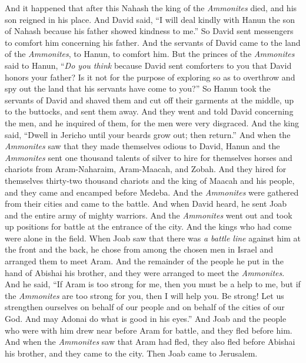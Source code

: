 \begin{biblechapter} %
 And it happened that after this Nahash the king of the \textit{Ammonites} died, and his son reigned in his place.
\verse And David said, “I will deal kindly with Hanun the son of Nahash because his father showed kindness to me.” So David sent messengers to comfort him concerning his father. And the servants of David came to the land of the \textit{Ammonites}, to Hanun, to comfort him.
\verse But the princes of the \textit{Ammonites} said to Hanun, “\textit{Do you think} because David sent comforters to you that David honors your father? Is it not for the purpose of exploring so as to overthrow and spy out the land that his servants have come to you?”
\verse So Hanun took the servants of David and shaved them and cut off their garments at the middle, up to the buttocks, and sent them away.
\verse And they went and told David concerning the men, and he inquired of them, for the men were very disgraced. And the king said, “Dwell in Jericho until your beards grow out; then return.”
\verse And when the \textit{Ammonites} saw that they made themselves odious to David, Hanun and the \textit{Ammonites} sent one thousand talents of silver to hire for themselves horses and chariots from Aram-Naharaim, Aram-Maacah, and Zobah.
\verse And they hired for themselves thirty-two thousand chariots and the king of Maacah and his people, and they came and encamped before Medeba. And the \textit{Ammonites} were gathered from their cities and came to the battle.
\verse And when David heard, he sent Joab and the entire army of mighty warriors.
\verse And the \textit{Ammonites} went out and took up positions for battle at the entrance of the city. And the kings who had come were alone in the field.
\verse When Joab saw that there was \textit{a battle line} against him at the front and the back, he chose from among the chosen men in Israel and arranged them to meet Aram.
\verse And the remainder of the people he put in the hand of Abishai his brother, and they were arranged to meet the \textit{Ammonites}.
\verse And he said, “If Aram is too strong for me, then you must be a help to me, but if the \textit{Ammonites} are too strong for you, then I will help you.
\verse Be strong! Let us strengthen ourselves on behalf of our people and on behalf of the cities of our God. And may Adonai do what is good in his eyes.”
\verse And Joab and the people who were with him drew near before Aram for battle, and they fled before him.
\verse And when the \textit{Ammonites} saw that Aram had fled, they also fled before Abishai his brother, and they came to the city. Then Joab came to Jerusalem.

\end{biblechapter}
